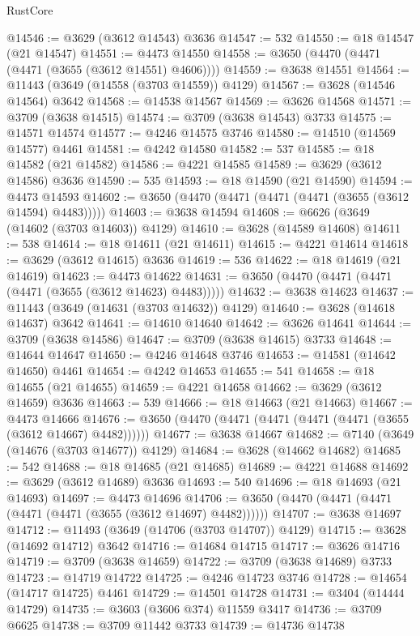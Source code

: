 \begin{lexlean}{RustCore}
\begin{coremodule}
@14546 := @3629 (@3612 @14543) @3636
@14547 := 532
@14550 := @18 @14547 (@21 @14547)
@14551 := @4473 @14550
@14558 := @3650 (@4470 (@4471 (@4471 (@3655 (@3612 @14551) @4606))))
@14559 := @3638 @14551
@14564 := @11443 (@3649 (@14558 (@3703 @14559)) @4129)
@14567 := @3628 (@14546 @14564) @3642
@14568 := @14538 @14567
@14569 := @3626 @14568
@14571 := @3709 (@3638 @14515)
@14574 := @3709 (@3638 @14543) @3733
@14575 := @14571 @14574
@14577 := @4246 @14575 @3746
@14580 := @14510 (@14569 @14577) @4461
@14581 := @4242 @14580
@14582 := 537
@14585 := @18 @14582 (@21 @14582)
@14586 := @4221 @14585
@14589 := @3629 (@3612 @14586) @3636
@14590 := 535
@14593 := @18 @14590 (@21 @14590)
@14594 := @4473 @14593
@14602 := @3650 (@4470 (@4471 (@4471 (@4471 (@3655 (@3612 @14594) @4483)))))
@14603 := @3638 @14594
@14608 := @6626 (@3649 (@14602 (@3703 @14603)) @4129)
@14610 := @3628 (@14589 @14608)
@14611 := 538
@14614 := @18 @14611 (@21 @14611)
@14615 := @4221 @14614
@14618 := @3629 (@3612 @14615) @3636
@14619 := 536
@14622 := @18 @14619 (@21 @14619)
@14623 := @4473 @14622
@14631 := @3650 (@4470 (@4471 (@4471 (@4471 (@3655 (@3612 @14623) @4483)))))
@14632 := @3638 @14623
@14637 := @11443 (@3649 (@14631 (@3703 @14632)) @4129)
@14640 := @3628 (@14618 @14637) @3642
@14641 := @14610 @14640
@14642 := @3626 @14641
@14644 := @3709 (@3638 @14586)
@14647 := @3709 (@3638 @14615) @3733
@14648 := @14644 @14647
@14650 := @4246 @14648 @3746
@14653 := @14581 (@14642 @14650) @4461
@14654 := @4242 @14653
@14655 := 541
@14658 := @18 @14655 (@21 @14655)
@14659 := @4221 @14658
@14662 := @3629 (@3612 @14659) @3636
@14663 := 539
@14666 := @18 @14663 (@21 @14663)
@14667 := @4473 @14666
@14676 := @3650 (@4470 (@4471 (@4471 (@4471 (@4471 (@3655 (@3612 @14667) @4482))))))
@14677 := @3638 @14667
@14682 := @7140 (@3649 (@14676 (@3703 @14677)) @4129)
@14684 := @3628 (@14662 @14682)
@14685 := 542
@14688 := @18 @14685 (@21 @14685)
@14689 := @4221 @14688
@14692 := @3629 (@3612 @14689) @3636
@14693 := 540
@14696 := @18 @14693 (@21 @14693)
@14697 := @4473 @14696
@14706 := @3650 (@4470 (@4471 (@4471 (@4471 (@4471 (@3655 (@3612 @14697) @4482))))))
@14707 := @3638 @14697
@14712 := @11493 (@3649 (@14706 (@3703 @14707)) @4129)
@14715 := @3628 (@14692 @14712) @3642
@14716 := @14684 @14715
@14717 := @3626 @14716
@14719 := @3709 (@3638 @14659)
@14722 := @3709 (@3638 @14689) @3733
@14723 := @14719 @14722
@14725 := @4246 @14723 @3746
@14728 := @14654 (@14717 @14725) @4461
@14729 := @14501 @14728
@14731 := @3404 (@14444 @14729)
@14735 := @3603 (@3606 @374) @11559 @3417
@14736 := @3709 @6625
@14738 := @3709 @11442 @3733
@14739 := @14736 @14738

\end{coremodule}
\end{lexlean}
